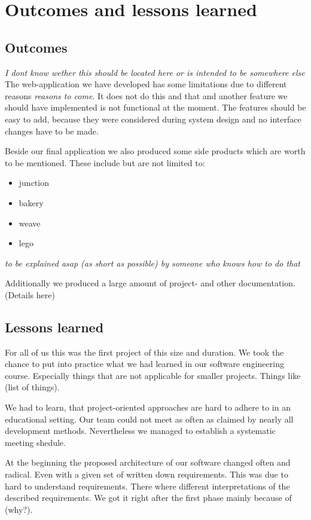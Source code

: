 
\section{Outcomes and lessons learned}
\subsection{Outcomes}
\emph{I dont know wether this should be located here or is intended to be somewhere else}
The web-application we have developed has some limitations due to different reasons \textsl{reasons to come}. It does not do this and that and another feature we should have implemented is not functional at the moment. The features should be easy to add, because they were considered during system design and no interface changes have to be made.

Beside our final application we also produced some side products which are worth to be mentioned. These include but are not limited to:
\begin{itemize}
	\item junction
	\item bakery
	\item weave
	\item lego
\end{itemize}
\emph{to be explained asap (as short as possible) by someone who knows how to do that}

Additionally we produced a large amount of project- and other documentation. (Details here)

\subsection{Lessons learned}
For all of us this was the first project of this size and duration. We took the chance to put into practice what we had learned in our software engineering course. Especially things that are not applicable for smaller projects. Things like (list of things).

We had to learn, that project-oriented approaches are hard to adhere to in an educational setting. Our team could not meet as often as claimed by nearly all development methods. Nevertheless we managed to establish a systematic meeting shedule.

At the beginning the proposed architecture of our software changed often and radical. Even with a given set of written down requirements. This was due to hard to understand requirements. There where different interpretations of the described requirements. We got it right after the first phase mainly because of (why?).

